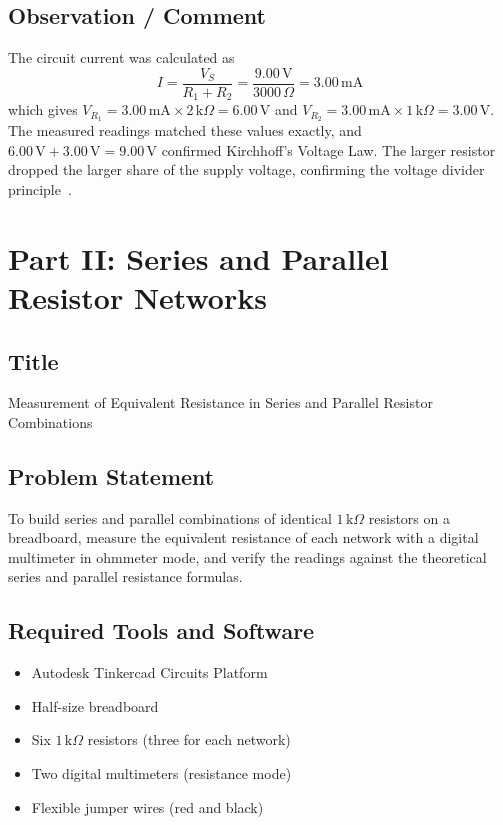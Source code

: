\documentclass[11pt,a4paper]{article}
\begin{document}
\subsection{Observation / Comment}
The circuit current was calculated as
\[
I = \frac{V_S}{R_1 + R_2} = \frac{9.00\,\text{V}}{3000\,\Omega} = 3.00\,\text{mA}
\]
which gives $V_{R_1} = 3.00\,\text{mA} \times 2\,\text{k}\Omega = 6.00\,\text{V}$ and $V_{R_2} = 3.00\,\text{mA} \times 1\,\text{k}\Omega = 3.00\,\text{V}$. The measured readings matched these values exactly, and $6.00\,\text{V} + 3.00\,\text{V} = 9.00\,\text{V}$ confirmed Kirchhoff's Voltage Law. The larger resistor dropped the larger share of the supply voltage, confirming the voltage divider principle~\cite{ref_boylestad}.

\section{Part II: Series and Parallel Resistor Networks}

\subsection{Title}
Measurement of Equivalent Resistance in Series and Parallel Resistor Combinations

\subsection{Problem Statement}
To build series and parallel combinations of identical $1\,\text{k}\Omega$ resistors on a breadboard, measure the equivalent resistance of each network with a digital multimeter in ohmmeter mode, and verify the readings against the theoretical series and parallel resistance formulas.

\subsection{Required Tools and Software}
\begin{itemize}
    \item Autodesk Tinkercad Circuits Platform~\cite{ref_tinkercad}
    \item Half-size breadboard
    \item Six $1\,\text{k}\Omega$ resistors (three for each network)
    \item Two digital multimeters (resistance mode)
    \item Flexible jumper wires (red and black)
\end{itemize}
\end{document}
